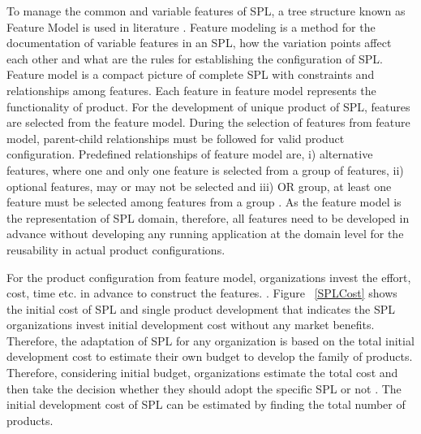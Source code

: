 To manage the common and variable features of SPL, a tree structure known as Feature Model is used in literature \cite{tr21, t22, t23}. Feature modeling is a method for the documentation of variable features in an SPL, how the variation points affect each other and what are the rules for establishing the configuration of SPL. Feature model is a compact picture of complete SPL with constraints and relationships among features. Each feature in feature model represents the functionality of product. For the development of unique product of SPL, features are selected from the feature model. During the selection of features from feature model, parent-child relationships must be followed for valid product configuration. Predefined relationships of feature model are, i) alternative features, where one and only one feature is selected from a group of features, ii) optional features, may or may not be selected and iii) OR group, at least one feature must be selected among features from a group \cite{tt17, tt18}. As the feature model is the representation of SPL domain, therefore, all features need to be developed in advance without developing any running application at the domain level for the reusability in actual product configurations. 


For the product configuration from feature model, organizations invest the effort, cost, time etc. in advance to construct the features. \cite{t24, t25, t26, t27}. Figure ~\ref{SPLCost} \cite{tt26} shows the initial cost of SPL and single product development that indicates the SPL organizations invest initial development cost without any market benefits. Therefore, the adaptation of SPL for any organization is based on the total initial development cost to estimate their own budget to develop the family of products.  Therefore, considering initial budget, organizations estimate the total cost and then take the decision whether they should adopt the specific SPL or not \cite{t28, t29, t30}. The initial development cost of SPL can be estimated by finding the total number of products.

